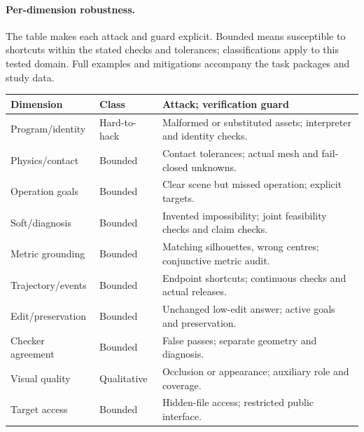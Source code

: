 \paragraph{Per-dimension robustness.}
The table makes each attack and guard explicit. Bounded means susceptible to shortcuts within the stated checks and tolerances; classifications apply to this tested domain. Full examples and mitigations accompany the task packages and study data.
\begin{center}\small\begin{tabular}{p{.20\linewidth}p{.17\linewidth}p{.52\linewidth}}\toprule
Dimension & Class & Attack; verification guard \\ \midrule
Program/identity & Hard-to-hack & Malformed or substituted assets; interpreter and identity checks. \\
Physics/contact & Bounded & Contact tolerances; actual mesh and fail-closed unknowns. \\
Operation goals & Bounded & Clear scene but missed operation; explicit targets. \\
Soft/diagnosis & Bounded & Invented impossibility; joint feasibility checks and claim checks. \\
Metric grounding & Bounded & Matching silhouettes, wrong centres; conjunctive metric audit. \\
Trajectory/events & Bounded & Endpoint shortcuts; continuous checks and actual releases. \\
Edit/preservation & Bounded & Unchanged low-edit answer; active goals and preservation. \\
Checker agreement & Bounded & False passes; separate geometry and diagnosis. \\
Visual quality & Qualitative & Occlusion or appearance; auxiliary role and coverage. \\
Target access & Bounded & Hidden-file access; restricted public interface. \\ \bottomrule
\end{tabular}\end{center}
